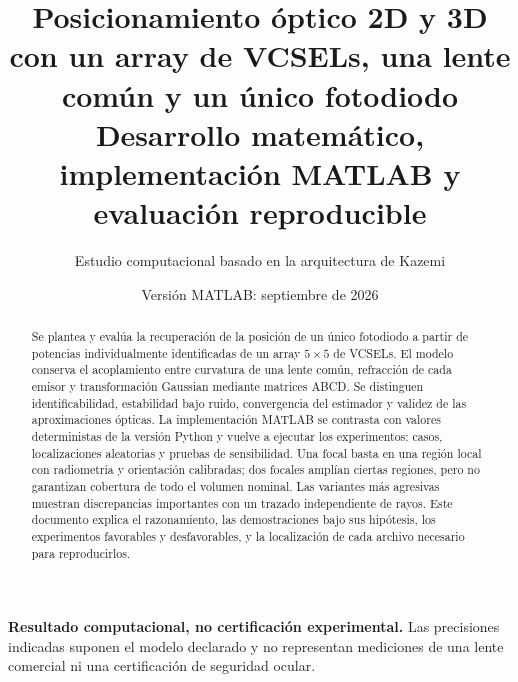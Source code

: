 \documentclass[11pt,a4paper]{article}
\title{Posicionamiento óptico 2D y 3D con un array de VCSELs, una lente común y un único fotodiodo\\[0.4em]\large Desarrollo matemático, implementación MATLAB y evaluación reproducible}
\author{Estudio computacional basado en la arquitectura de Kazemi}
\date{Versión MATLAB: septiembre de 2026}
\begin{document}
\maketitle
\begin{abstract}
Se plantea y evalúa la recuperación de la posición de un único fotodiodo a partir de potencias individualmente identificadas de un array $5\times5$ de VCSELs. El modelo conserva el acoplamiento entre curvatura de una lente común, refracción de cada emisor y transformación Gaussian mediante matrices ABCD. Se distinguen identificabilidad, estabilidad bajo ruido, convergencia del estimador y validez de las aproximaciones ópticas. La implementación MATLAB se contrasta con valores deterministas de la versión Python y vuelve a ejecutar los experimentos: \NumeroCasos{} casos, \NumeroEnsayos{} localizaciones aleatorias y \NumeroSensibilidad{} pruebas de sensibilidad. Una focal basta en una región local con radiometría y orientación calibradas; dos focales amplían ciertas regiones, pero no garantizan cobertura de todo el volumen nominal. Las variantes más agresivas muestran discrepancias importantes con un trazado independiente de rayos. Este documento explica el razonamiento, las demostraciones bajo sus hipótesis, los experimentos favorables y desfavorables, y la localización de cada archivo necesario para reproducirlos.
\end{abstract}
\textbf{Resultado computacional, no certificación experimental.} Las precisiones indicadas suponen el modelo declarado y no representan mediciones de una lente comercial ni una certificación de seguridad ocular.
\tableofcontents
\clearpage







\end{document}
